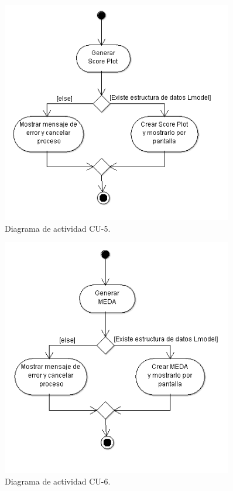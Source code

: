 \begin{figure}[H]
\centering
\includegraphics[width=0.9\textwidth]{imagenes/diagramas/DA3.png}
\caption{Diagrama de actividad CU-5.}
\end{figure}

\begin{figure}[H]
\centering
\includegraphics[width=0.9\textwidth]{imagenes/diagramas/DA4.png}
\caption{Diagrama de actividad CU-6.}
\end{figure}


